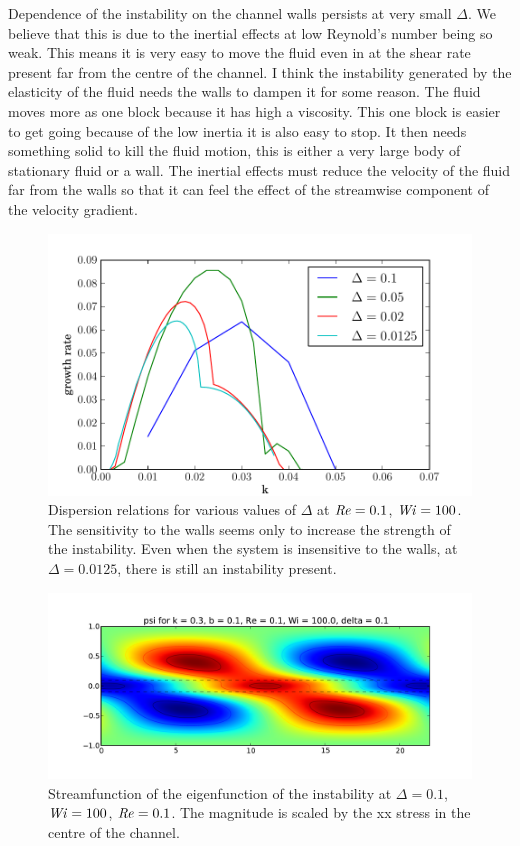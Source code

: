 \documentclass{jfm}
\newcommand\Wi{\mbox{\textit{Wi}}}
\newcommand\Rey{\mbox{\textit{Re}}}  %
\begin{document}
Dependence of the instability on the channel walls persists at very small
$\Delta$. We believe that this is due to the inertial effects at low Reynold's
number being so weak. This means it is very easy to move the fluid even in at
the shear rate present far from the centre of the channel. I think the
instability generated by the elasticity of the fluid needs the walls to dampen
it for some reason. The fluid moves more as one block because it has high a
viscosity. This one block is easier to get going because of the low inertia it
is also easy to stop. It then needs something solid to kill the fluid motion,
this is either a very large body of stationary fluid or a wall. The inertial
effects must reduce the velocity of the fluid far from the walls so that it can
feel the effect of the streamwise component of the velocity gradient.

\begin{figure}
    \centering
    \includegraphics[width=\textwidth]{KH_vary_delta}
    \caption{
    Dispersion relations for various values of $\Delta$ at $\Rey = 0.1$, $\Wi =
    100$. The sensitivity to the walls seems only to increase the strength of
    the instability. Even when the system is insensitive to the walls, at
    $\Delta= 0.0125$, there is still an instability present.
    }
    \label{fig:walls_dependence}
\end{figure}

\begin{figure}
    \centering
    \includegraphics[width=\textwidth]{psi_high_delta}
    \caption{
    Streamfunction of the eigenfunction of the instability at $\Delta = 0.1$,
    $\Wi = 100$, $\Rey=0.1$. The magnitude is scaled by the xx stress in the
    centre of the channel.
    }
    \label{fig:psi_high_delta}
\end{figure}
\end{document}
